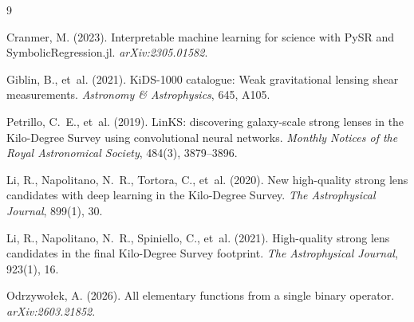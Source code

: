 \documentclass[12pt,a4paper]{article}
\begin{document}

\begin{thebibliography}{9}

Cranmer, M. (2023).
Interpretable machine learning for science with PySR and SymbolicRegression.jl.
\textit{arXiv:2305.01582}.

Giblin, B., et~al. (2021).
KiDS-1000 catalogue: Weak gravitational lensing shear measurements.
\textit{Astronomy \& Astrophysics}, 645, A105.


Petrillo, C.~E., et~al. (2019).
LinKS: discovering galaxy-scale strong lenses in the Kilo-Degree Survey
using convolutional neural networks.
\textit{Monthly Notices of the Royal Astronomical Society}, 484(3), 3879--3896.

Li, R., Napolitano, N.~R., Tortora, C., et~al. (2020).
New high-quality strong lens candidates with deep learning in the Kilo-Degree Survey.
\textit{The Astrophysical Journal}, 899(1), 30.

Li, R., Napolitano, N.~R., Spiniello, C., et~al. (2021).
High-quality strong lens candidates in the final Kilo-Degree Survey footprint.
\textit{The Astrophysical Journal}, 923(1), 16.

Odrzywołek, A. (2026).
All elementary functions from a single binary operator.
\textit{arXiv:2603.21852}.

\end{thebibliography}
\end{document}
